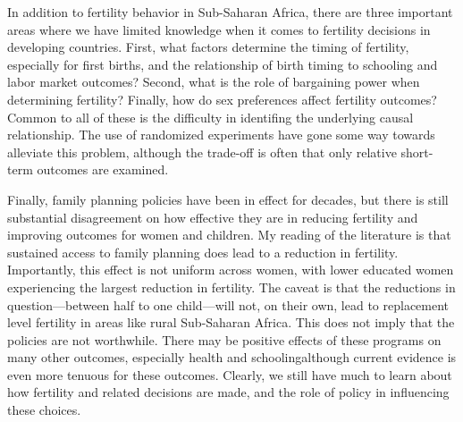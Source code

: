 In addition to fertility behavior in Sub-Saharan Africa, there are three important areas where we have limited knowledge when it comes to fertility decisions in developing countries. First, what factors determine the timing of fertility, especially for first births, and the relationship of birth timing to schooling and labor market outcomes? Second, what is the role of bargaining power when determining fertility? Finally, how do sex preferences affect fertility outcomes? Common to all of these is the difficulty in identifing the underlying causal relationship. The use of randomized experiments have gone some way towards alleviate this problem, although the trade-off is often that only relative short-term outcomes are examined.

Finally, family planning policies have been in effect for decades, but there is still substantial disagreement on how effective they are in reducing fertility and improving outcomes for women and children. My reading of the literature is that sustained access to family planning does lead to a reduction in fertility. Importantly, this effect is not uniform across women, with lower educated women experiencing the largest reduction in fertility. The caveat is that the reductions in question---between half to one child---will not, on their own, lead to replacement level fertility in areas like rural Sub-Saharan Africa. This does not imply that the policies are not worthwhile. There may be positive effects of these programs on many other outcomes, especially health and schoolingalthough current evidence is even more tenuous for these outcomes. Clearly, we still have much to learn about how fertility and related decisions are made, and the role of policy in influencing these choices.
